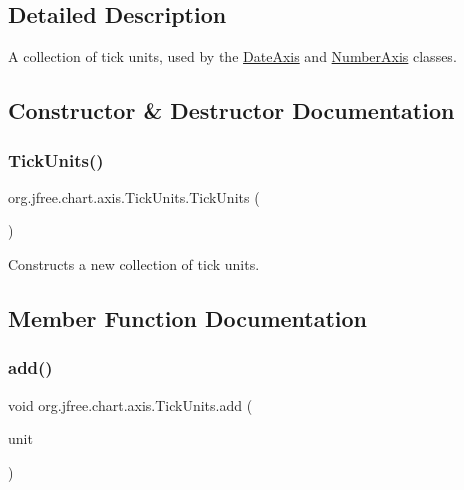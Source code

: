 \subsection{Detailed Description}
A collection of tick units, used by the \mbox{\hyperlink{classorg_1_1jfree_1_1chart_1_1axis_1_1_date_axis}{Date\+Axis}} and \mbox{\hyperlink{classorg_1_1jfree_1_1chart_1_1axis_1_1_number_axis}{Number\+Axis}} classes. 

\subsection{Constructor \& Destructor Documentation}
\mbox{\label{classorg_1_1jfree_1_1chart_1_1axis_1_1_tick_units_ad84724a61635ad62f45065f7969f3d23}} 
\subsubsection{\texorpdfstring{Tick\+Units()}{TickUnits()}}
{\footnotesize\ttfamily org.\+jfree.\+chart.\+axis.\+Tick\+Units.\+Tick\+Units (\begin{DoxyParamCaption}{ }\end{DoxyParamCaption})}

Constructs a new collection of tick units. 

\subsection{Member Function Documentation}
\mbox{\label{classorg_1_1jfree_1_1chart_1_1axis_1_1_tick_units_a61de767ebfb2115a7e374cc70f5901f5}} 
\subsubsection{\texorpdfstring{add()}{add()}}
{\footnotesize\ttfamily void org.\+jfree.\+chart.\+axis.\+Tick\+Units.\+add (\begin{DoxyParamCaption}\item[{\mbox{\hyperlink{classorg_1_1jfree_1_1chart_1_1axis_1_1_tick_unit}{Tick\+Unit}}}]{unit }\end{DoxyParamCaption})}

